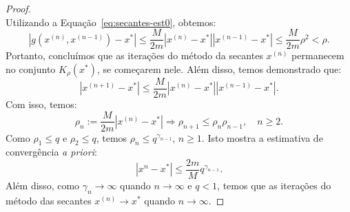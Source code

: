 \begin{ex}
\begin{proof}
\begin{equation}
\end{equation}
Utilizando a Equação~\eqref{eq:secantes-est0}, obtemos:
\begin{equation}
  |g(x^{(n)},x^{(n-1)})-x^*| \leq \frac{M}{2m}|x^{(n)}-x^*||x^{(n-1)}-x^*| \leq \frac{M}{2m}\rho^2 < \rho.
\end{equation}
Portanto, concluímos que as iterações do método da secantes $x^{(n)}$ permanecem no conjunto $K_\rho(x^*)$, se começarem nele. Além disso, temos demonstrado que:
\begin{equation}
  |x^{(n+1)} - x^*| \leq \frac{M}{2m}|x^{(n)} - x^*||x^{(n-1)} - x^*|.
\end{equation}
Com isso, temos:
\begin{equation}
  \rho_n := \frac{M}{2m}|x^{(n)} - x^*| \Rightarrow \rho_{n+1} \leq \rho_{n}\rho_{n-1},\quad n\geq 2.
\end{equation}
Como $\rho_1 \leq q$ e $\rho_2 \leq q$, temos $\rho_n \leq q^{\gamma_{n-1}}$, $n\geq 1$. Isto mostra a estimativa de convergência \emph{a priori}:
\begin{equation}
  |x^{n} - x^*| \leq \frac{2m}{M}q^{\gamma_{n-1}}.
\end{equation}
Além disso, como $\gamma_{n}\to \infty$ quando $n\to\infty$ e $q < 1$, temos que as iterações do método das secantes $x^{(n)}\to x^*$ quando $n\to \infty$.


\end{proof}
\end{ex}
